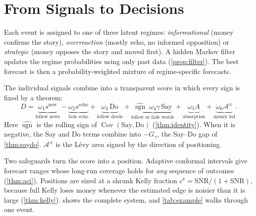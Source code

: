 \documentclass[11pt,a4paper]{article}
\theoremstyle{sci}
\theoremstyle{scidef}
\DeclareMathOperator{\sgn}{sgn}
\DeclareMathOperator{\Cov}{Cov}
\begin{document}
\section{From Signals to Decisions}\label{sec:decisions}

Each event is assigned to one of three latent regimes: \emph{informational} (money confirms the story), \emph{overreaction} (mostly echo, no informed opposition) or \emph{strategic} (money opposes the story and moved first). A hidden Markov filter updates the regime probabilities using only past data (\cref{prop:filter}). The best forecast is then a probability-weighted mixture of regime-specific forecasts.

The individual signals combine into a transparent score in which every sign is fixed by a theorem:
\[
  D=\underbrace{\omega_1s^{\mathrm{new}}}_{\text{follow news}}
  -\underbrace{\omega_2s^{\mathrm{echo}}}_{\text{fade echo}}
  +\underbrace{\omega_3\,\mathrm{Do}}_{\text{follow deeds}}
  +\underbrace{\widehat{\sgn}\;\omega_4\gamma\,\mathrm{Say}}_{\text{follow or fade words}}
  +\underbrace{\omega_5A}_{\text{absorption}}
  +\underbrace{\omega_6\mathcal{A}^{\pm}}_{\text{money led}} .
\]
Here $\widehat{\sgn}$ is the rolling sign of $\Cov(\text{Say},\text{Do})$ (\cref{thm:identity}). When it is negative, the Say and Do terms combine into $-G_\gamma$, the Say--Do gap of \cref{thm:saydo}. $\mathcal{A}^\pm$ is the L\'evy area signed by the direction of positioning.

Two safeguards turn the score into a position. Adaptive conformal intervals give forecast ranges whose long-run coverage holds for \emph{any} sequence of outcomes (\cref{thm:aci}). Positions are sized at a shrunk Kelly fraction $c^\star=\mathrm{SNR}/(1+\mathrm{SNR})$, because full Kelly loses money whenever the estimated edge is noisier than it is large (\cref{thm:kelly}).  shows the complete system, and \cref{tab:example} walks through one event.
\end{document}
